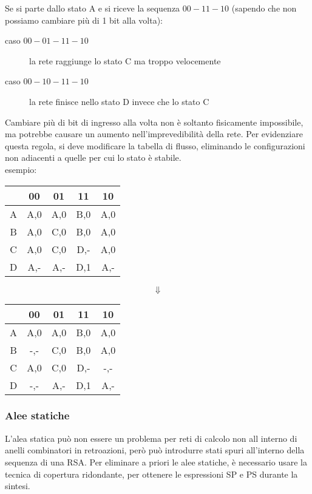 \documentclass{article}
\begin{document}
\noindent
Se si parte dallo stato A e si riceve la sequenza $00-11-10$ (sapendo che non possiamo cambiare più di 1 bit alla volta):

\begin{description}
	\item[caso $00-01-11-10$] la rete raggiunge lo stato C ma troppo velocemente
	\item[caso $00-10-11-10$] la rete finisce nello stato D invece che lo stato C
\end{description}

\noindent
Cambiare più di bit di ingresso alla volta non è soltanto fisicamente impossibile, ma potrebbe causare un aumento nell'imprevedibilità della rete.
Per evidenziare questa regola, si deve modificare la tabella di flusso, eliminando le configurazioni non adiacenti a quelle per cui lo stato è stabile.\\

\noindent
esempio:

\begin{center}
\begin{tabular}{ |c|c|c|c|c| }
\hline
& 00 & 01 & 11 & 10 \\
\hline
\hline
A & A,0 & A,0 & B,0 & A,0 \\
B & A,0 & C,0 & B,0 & A,0 \\
C & A,0 & C,0 & D,- & A,0 \\
D & A,- & A,- & D,1 & A,- \\
\hline
\end{tabular}

$$\Downarrow$$

\begin{tabular}{ |c|c|c|c|c| }
\hline
& 00 & 01 & 11 & 10 \\
\hline
\hline
A & A,0 & A,0 & B,0 & A,0 \\
B & -,- & C,0 & B,0 & A,0 \\
C & A,0 & C,0 & D,- & -,- \\
D & -,- & A,- & D,1 & A,- \\
\hline
\end{tabular}
\end{center}

\subsubsection{Alee statiche}

L'alea statica può non essere un problema per reti di calcolo non all interno di anelli combinatori in retroazioni, però può introdurre stati spuri all'interno della sequenza di una RSA.
Per eliminare a priori le alee statiche, è necessario usare la tecnica di copertura ridondante, per ottenere le espressioni SP e PS durante la sintesi.
\end{document}
